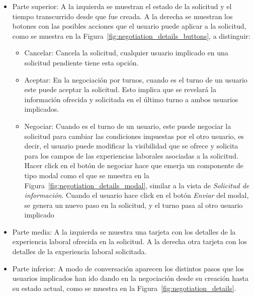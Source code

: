 \documentclass[a4paper, 12pt]{book}
\begin{document}
    \begin{itemize}
        \item Parte superior: A la izquierda se muestran el estado de la solicitud y el tiempo transcurrido desde que fue creada.
        A la derecha se muestran los botones con las posibles acciones que el usuario puede aplicar a la solicitud,
        como se muestra en la Figura~\ref{fig:negotiation_details_buttons}, a distinguir:
        \begin{itemize}
            \item Cancelar: Cancela la solicitud, cualquier usuario implicado en una solicitud pendiente tiene esta opción.
            \item Aceptar: En la negociación por turnos, cuando es el turno de un usuario este puede aceptar la solicitud.
            Esto implica que se revelará la información ofrecida y solicitada en el último turno a ambos usuarios implicados.
            \item Negociar: Cuando es el turno de un usuario, este puede negociar la solicitud para cambiar las condiciones impuestas
            por el otro usuario, es decir, el usuario puede modificar la visibilidad que se ofrece
            y solicita para los campos de las experiencias laborales asociadas a la solicitud.
            Hacer click en el botón de negociar hace que emerja un componente de tipo modal como el que se muestra en
            la Figura~\ref{fig:negotiation_details_modal}, similar a la vista de \emph{Solicitud de información}.
            Cuando el usuario hace click en el botón \emph{Enviar} del modal, se genera un nuevo paso en la solicitud,
            y el turno pasa al otro usuario implicado
        \end{itemize}
        \item Parte media: A la izquierda se muestra una tarjeta con los detalles de la experiencia laboral ofrecida en la solicitud.
        A la derecha otra tarjeta con los detalles de la experiencia laboral solicitada.
        \item Parte inferior: A modo de conversación aparecen los distintos pasos que los usuarios
        implicados han ido dando en la negociación desde su creación hasta su estado actual, como se muestra en la Figura~\ref{fig:negotiation_details}.
    \end{itemize}
\end{document}
